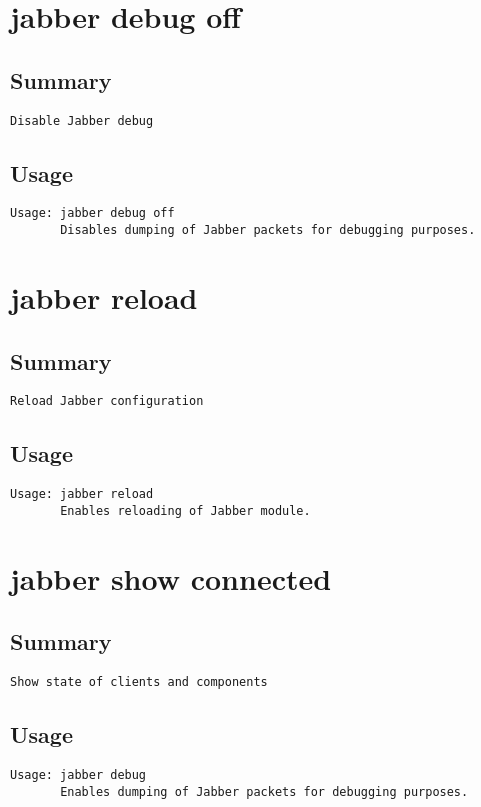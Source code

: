 \section{jabber debug off}
\subsection{Summary}
\begin{verbatim}
Disable Jabber debug
\end{verbatim}
\subsection{Usage}
\begin{verbatim}
Usage: jabber debug off
       Disables dumping of Jabber packets for debugging purposes.

\end{verbatim}


\section{jabber reload}
\subsection{Summary}
\begin{verbatim}
Reload Jabber configuration
\end{verbatim}
\subsection{Usage}
\begin{verbatim}
Usage: jabber reload
       Enables reloading of Jabber module.

\end{verbatim}


\section{jabber show connected}
\subsection{Summary}
\begin{verbatim}
Show state of clients and components
\end{verbatim}
\subsection{Usage}
\begin{verbatim}
Usage: jabber debug
       Enables dumping of Jabber packets for debugging purposes.

\end{verbatim}


